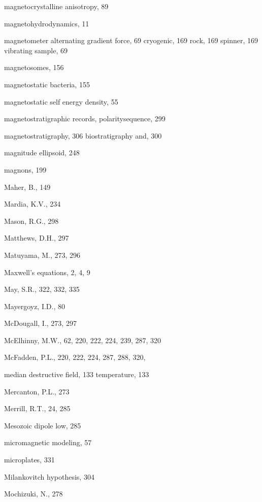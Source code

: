 \documentclass[,plain]{tauxe}
\begin{document}
\begin{theindex}
  
  \item magnetocrystalline anisotropy, 89
  \item magnetohydrodynamics, 11
  \item magnetometer
    \subitem alternating gradient force, 69
    \subitem cryogenic, 169
    \subitem rock, 169
    \subitem spinner, 169
    \subitem vibrating sample, 69
  \item magnetosomes, 156
  \item magnetostatic bacteria, 155
  \item magnetostatic self energy density, 55

  \item magnetostratigraphic records, polarity\break sequence, 299
  \item magnetostratigraphy, 306
  \subitem  biostratigraphy and, 300
  \item magnitude ellipsoid, 248
  \item magnons, 199
  \item Maher, B., 149
  \item Mardia, K.V., 234
  \item Mason, R.G., 298
  \item Matthews, D.H., 297
  \item Matuyama, M., 273, 296
  \item Maxwell's equations, 2, 4, 9
  \item May, S.R., 322, 332, 335
  \item Mayergoyz, I.D., 80
  \item McDougall, I., 273, 297
  \item McElhinny, M.W., 62, 220, 222, 224, 239, 287, 320
  \item McFadden, P.L., 220, 222, 224, 287, 288, 320,
  \item median destructive
    \subitem field, 133
    \subitem temperature, 133
  \item Mercanton, P.L., 273
  \item Merrill, R.T., 24, 285
  \item Mesozoic dipole low, 285
  \item micromagnetic modeling, 57
  \item microplates, 331
  \item Milankovitch hypothesis, 304
  \item Mochizuki, N., 278

\end{theindex}
\end{document}
